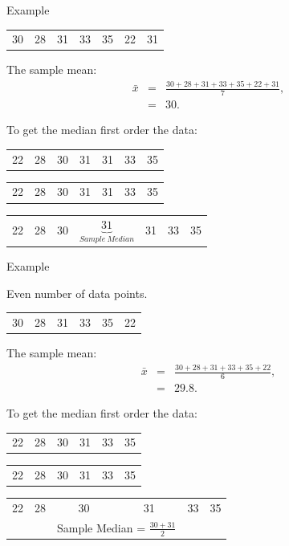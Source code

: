 \begin{frame}{Example}

  \begin{tabular}{lllllll}
    30 & 28 & 31 & 33 & 35 & 22 & 31
  \end{tabular}

  The sample mean:
  \begin{eqnarray*}
    \bar{x} & = & \frac{30 + 28 + 31 + 33 + 35 + 22 + 31}{7}, \\
    & = & 30.
  \end{eqnarray*}

  To get the median first order the data: \\
  {
    \begin{tabular}{lllllll}
      22 & 28 & 30 & 31 & 31 & 33 & 35
    \end{tabular}
  }

  {
    \begin{tabular}{lllllll}
      {\color{red}22} & {\color{red}28} & {\color{red}30} & 31 & {\color{blue}31} & {\color{blue}33} & {\color{blue}35}
    \end{tabular}
  }

  {
    \begin{tabular}{lllllll}
      {\color{red}22} & {\color{red}28} & {\color{red}30} &
      $\underbrace{31}_{Sample~Median}$ & {\color{blue}31} & {\color{blue}33} & {\color{blue}35}
    \end{tabular}
  }
  
\end{frame}


\begin{frame}{Example}

  Even number of data points.

  \begin{tabular}{cccccc}
    30 & 28 & 31 & 33 & 35 & 22 
  \end{tabular}

  The sample mean:
  \begin{eqnarray*}
    \bar{x} & = & \frac{30 + 28 + 31 + 33 + 35 + 22}{6}, \\
    & = & 29.8.
  \end{eqnarray*}

  To get the median first order the data: \\
  {
    \begin{tabular}{cccccc}
      22 & 28 & 30 & 31 & 33 & 35
    \end{tabular}
  }

  {
    \begin{tabular}{cccccc}
      {\color{red}22} & {\color{red}28} & 30 & 31  & {\color{blue}33} & {\color{blue}35}
    \end{tabular}
  }

  {
    \begin{tabular}{cccccc}
      {\color{red}22} & {\color{red}28} & 30 & 31 & 
      {\color{blue}33} & {\color{blue}35} \\
      & & \multicolumn{2}{c}{Sample Median = $\frac{30+31}{2}$} 
    \end{tabular}
  }
  
\end{frame}


